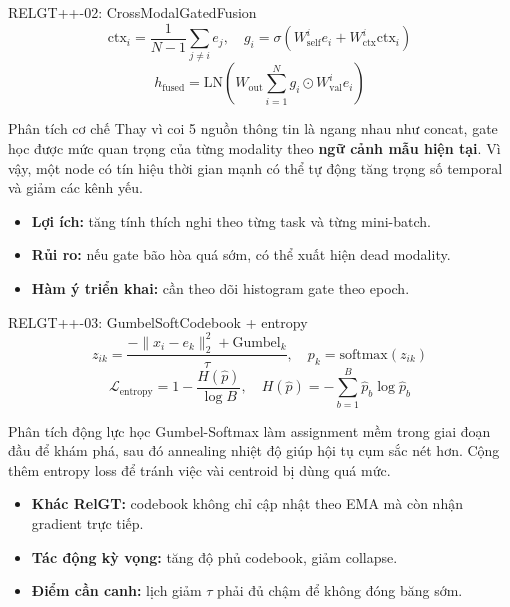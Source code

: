 \documentclass[aspectratio=169,11pt]{beamer}
\begin{document}
\begin{frame}{RELGT++-02: CrossModalGatedFusion}
  \[
    \text{ctx}_i=\frac{1}{N-1}\sum_{j\ne i}e_j,\quad
    g_i=\sigma(W^i_\text{self}e_i+W^i_\text{ctx}\text{ctx}_i)
  \]
  \[
    h_\text{fused}=\text{LN}\left(W_\text{out}\sum_{i=1}^{N}g_i\odot W^i_\text{val}e_i\right)
  \]
  \begin{block}{Phân tích cơ chế}
    Thay vì coi 5 nguồn thông tin là ngang nhau như concat, gate học được mức quan trọng của từng modality theo \textbf{ngữ cảnh mẫu hiện tại}. Vì vậy, một node có tín hiệu thời gian mạnh có thể tự động tăng trọng số temporal và giảm các kênh yếu.
  \end{block}
  \begin{itemize}
    \item \textbf{Lợi ích:} tăng tính thích nghi theo từng task và từng mini-batch.
    \item \textbf{Rủi ro:} nếu gate bão hòa quá sớm, có thể xuất hiện dead modality.
    \item \textbf{Hàm ý triển khai:} cần theo dõi histogram gate theo epoch.
  \end{itemize}
\end{frame}

\begin{frame}{RELGT++-03: GumbelSoftCodebook + entropy}
  \[
    z_{ik}=\frac{-\|x_i-e_k\|_2^2+\text{Gumbel}_k}{\tau},\quad p_k=\text{softmax}(z_{ik})
  \]
  \[
    \mathcal{L}_\text{entropy}=1-\frac{H(\hat p)}{\log B},\quad
    H(\hat p)=-\sum_{b=1}^{B}\hat p_b\log\hat p_b
  \]
  \begin{block}{Phân tích động lực học}
    Gumbel-Softmax làm assignment mềm trong giai đoạn đầu để khám phá, sau đó annealing nhiệt độ giúp hội tụ cụm sắc nét hơn. Cộng thêm entropy loss để tránh việc vài centroid bị dùng quá mức.
  \end{block}
  \begin{itemize}
    \item \textbf{Khác RelGT:} codebook không chỉ cập nhật theo EMA mà còn nhận gradient trực tiếp.
    \item \textbf{Tác động kỳ vọng:} tăng độ phủ codebook, giảm collapse.
    \item \textbf{Điểm cần canh:} lịch giảm $\tau$ phải đủ chậm để không đóng băng sớm.
  \end{itemize}
\end{frame}
\end{document}
